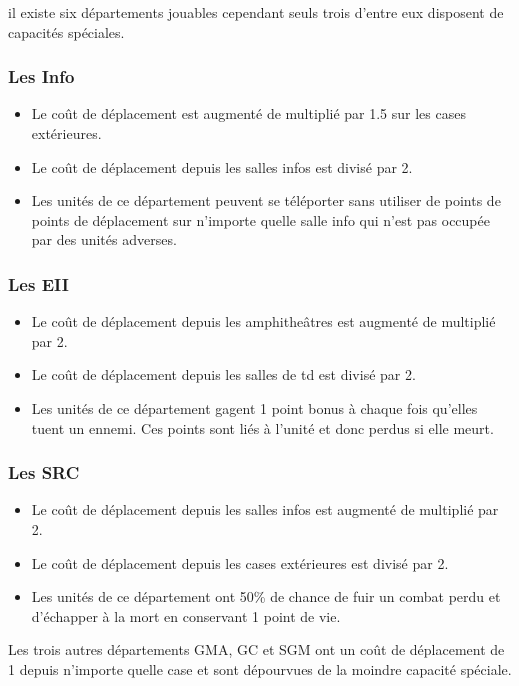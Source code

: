 il existe six départements jouables cependant seuls trois d'entre eux disposent de capacités spéciales. 

\subsubsection{Les Info}
\begin{itemize}
\item Le coût de déplacement est augmenté de multiplié par 1.5 sur les cases extérieures.
\item Le coût de déplacement depuis les salles infos est divisé par 2.
\item Les unités de ce département peuvent se téléporter sans utiliser de points de points de déplacement sur n'importe quelle salle info qui n'est pas occupée par des unités adverses.
\end{itemize}

\subsubsection{Les EII}
\begin{itemize}
\item Le coût de déplacement depuis les amphitheâtres est augmenté de multiplié par 2.
\item Le coût de déplacement depuis les salles de td est divisé par 2.
\item Les unités de ce département gagent 1 point bonus à chaque fois qu'elles tuent un ennemi. Ces points sont liés à l'unité et donc perdus si elle meurt.
\end{itemize} 

\subsubsection{Les SRC}
\begin{itemize}
\item Le coût de déplacement depuis les salles infos est augmenté de multiplié par 2.
\item Le coût de déplacement depuis les cases extérieures est divisé par 2.
\item Les unités de ce département ont 50\% de chance de fuir un combat perdu et d'échapper à la mort en conservant 1 point de vie. 
\end{itemize}

Les trois autres départements GMA, GC et SGM ont un coût de déplacement de 1 depuis n'importe quelle case et sont dépourvues de la moindre capacité spéciale.